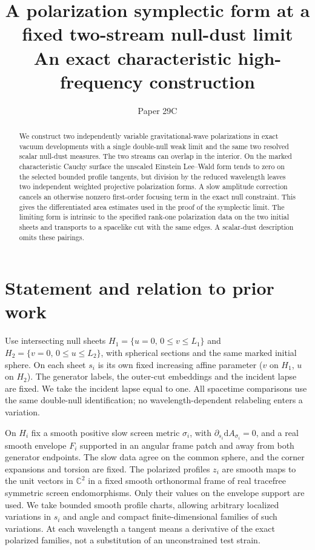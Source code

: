 \documentclass[11pt]{article}
\title{A polarization symplectic form at a fixed two-stream null-dust limit\\
\large An exact characteristic high-frequency construction}
\author{}
\date{Paper 29C}
\newcommand{\dd}{\mathrm d}
\begin{document}
\maketitle

\begin{abstract}
We construct two independently variable gravitational-wave
polarizations in exact vacuum developments with a single
double-null weak limit and the same two resolved scalar
null-dust measures. The two streams can overlap in the
interior. On the marked characteristic Cauchy surface the
unscaled Einstein Lee--Wald form tends to zero on the
selected bounded profile tangents, but division by the
reduced wavelength leaves two independent weighted projective
polarization forms. A slow amplitude correction cancels an
otherwise nonzero first-order focusing term in the exact
null constraint. This gives the differentiated area
estimates used in the proof of the symplectic limit. The
limiting form is intrinsic to the specified rank-one
polarization data on the two initial sheets and transports
to a spacelike cut with the same edges. A scalar-dust
description omits these pairings.
\end{abstract}

\section{Statement and relation to prior work}

Use intersecting null sheets \(H_1=\{u=0,\,0\leq v\leq L_1\}\)
and \(H_2=\{v=0,\,0\leq u\leq L_2\}\), with spherical
sections and the same marked initial sphere. On each sheet
\(s_i\) is its own fixed increasing affine parameter
(\(v\) on \(H_1\), \(u\) on \(H_2\)). The generator labels,
the outer-cut embeddings and the incident lapse are fixed.
We take the incident lapse equal to one. All spacetime
comparisons use the same double-null identification; no
wavelength-dependent relabeling enters a variation.

On \(H_i\) fix a smooth positive slow screen metric
\(\sigma_i\), with \(\partial_{s_i}\dd A_{\sigma_i}=0\),
and a real smooth envelope \(F_i\) supported in an angular
frame patch and away from both generator endpoints.
The slow data agree on the common sphere, and the
corner expansions and torsion are fixed. The polarized
profiles \(z_i\) are smooth maps to the unit vectors in
\(\mathbb C^2\) in a fixed smooth orthonormal frame of real
tracefree symmetric screen endomorphisms. Only their
values on the envelope support are used. We take bounded
smooth profile charts, allowing arbitrary localized
variations in \(s_i\) and angle and compact finite-dimensional
families of such variations. At each wavelength a tangent
means a derivative of the exact polarized families, not a
substitution of an unconstrained test strain.
\end{document}
